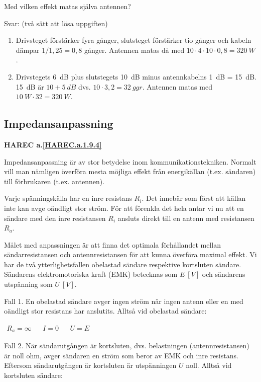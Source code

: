 Med vilken effekt matas själva antennen?

Svar: (två sätt att lösa uppgiften)
\begin{enumerate}
\item Drivsteget förstärker fyra gånger, slutsteget förstärker tio gånger och
kabeln dämpar \(1/1,25 = 0,8\) gånger. Antennen matas då med
\(10 \cdot 4 \cdot 10 \cdot 0,8 = 320\ W\).
\item Drivstegets 6~dB plus slutstegets 10~dB minus antennkabelns 1~dB = 15~dB.
15~dB är \(10 + 5\ dB\) dvs. \(10 \cdot 3,2 = 32\ ggr\). Antennen matas med
\(10\ W \cdot 32 = 320\ W\).
\end{enumerate}

\subsection{Impedansanpassning}
\textbf{HAREC a.\ref{HAREC.a.1.9.4}\label{myHAREC.a.1.9.4}}

Impedansanpassning är av stor betydelse inom kommunikationstekniken.
Normalt vill man nämligen överföra mesta möjliga effekt från energikällan
(t.ex. sändaren) till förbrukaren (t.ex. antennen).

Varje spänningskälla har en inre resistans \(R_i\). Det innebär som först att
källan inte kan avge oändligt stor ström.
För att förenkla det hela antar vi nu att en sändare med den inre resistansen
\(R_i\) ansluts direkt till en antenn med resistansen \(R_a\).

Målet med anpassningen är att finna det optimala förhållandet mellan
sändarresistansen och antennresistansen för att kunna överföra maximal effekt.
Vi har de två ytterlighetsfallen obelastad sändare respektive kortsluten
sändare. Sändarens elektromotoriska kraft (EMK) betecknas som \(E\ [V]\) och
sändarens utspänning som \(U\ [V]\).

Fall 1.
En obelastad sändare avger ingen ström när ingen antenn eller en med oändligt
stor resistans har anslutits.
Alltså vid obelastad sändare:

\(
\begin{array}{lllll}
R_a = \infty & & I = 0 & & U = E
\end{array}
\)

Fall 2.
När sändarutgången är kortsluten, dvs. belastningen (antennresistansen) är
noll ohm, avger sändaren en ström som beror av EMK och inre resistans.
Eftersom sändarutgången är kortsluten är utspänningen \(U\) noll.
Alltså vid kortsluten sändare:

